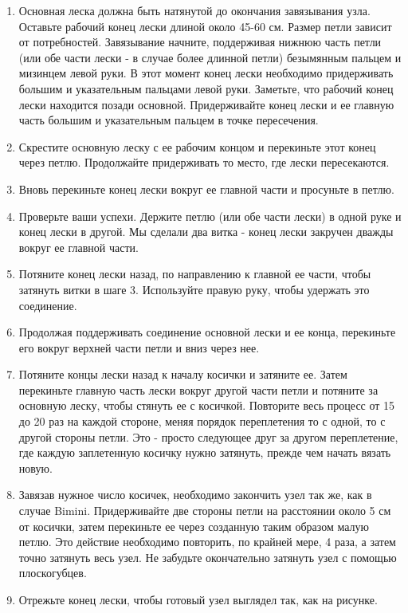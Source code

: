 \begin{enumerate}
 \item Основная леска должна быть натянутой до окончания завязывания узла. Оставьте рабочий конец лески длиной около 45-60 см. Размер петли зависит от потребностей. Завязывание начните, поддерживая нижнюю часть петли (или обе части лески - в случае более длинной петли) безымянным пальцем и мизинцем левой руки. В этот момент конец лески необходимо придерживать большим и указательным пальцами левой руки. Заметьте, что рабочий конец лески находится позади основной. Придерживайте конец лески и ее главную часть большим и указательным пальцем в точке пересечения.
 \item Скрестите основную леску с ее рабочим концом и перекиньте этот конец через петлю. Продолжайте придерживать то место, где лески пересекаются.
 \item Вновь перекиньте конец лески вокруг ее главной части и просуньте в петлю.
 \item Проверьте ваши успехи. Держите петлю (или обе части лески) в одной руке и конец лески в другой. Мы сделали два витка - конец лески закручен дважды вокруг ее главной части.
 \item Потяните конец лески назад, по направлению к главной ее части, чтобы затянуть витки в шаге 3. Используйте правую руку, чтобы удержать это соединение.
 \item Продолжая поддерживать соединение основной лески и ее конца, перекиньте его вокруг верхней части петли и вниз через нее.
 \item Потяните концы лески назад к началу косички и затяните ее. Затем перекиньте главную часть лески вокруг другой части петли и потяните за основную леску, чтобы стянуть ее с косичкой. Повторите весь процесс от 15 до 20 раз на каждой стороне, меняя порядок переплетения то с одной, то с другой стороны петли. Это - просто следующее друг за другом переплетение, где каждую заплетенную косичку нужно затянуть, прежде чем начать вязать новую.
 \item Завязав нужное число косичек, необходимо закончить узел так же, как в случае Bimini. Придерживайте две стороны петли на расстоянии около 5 см от косички, затем перекиньте ее через созданную таким образом малую петлю. Это действие необходимо повторить, по крайней мере, 4 раза, а затем точно затянуть весь узел. Не забудьте окончательно затянуть узел с помощью плоскогубцев.
 \item Отрежьте конец лески, чтобы готовый узел выглядел так, как на рисунке.
\end{enumerate}

